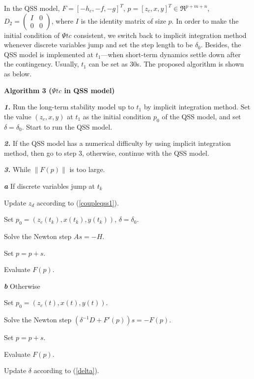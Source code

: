 \documentclass[journal]{IEEEtran}
\begin{document}
In the QSS model, $F=[-h_c,-f,-g]^T$, $p=[z_c,x,y]^T\in\Re^{p+m+n}$, $D_2=\left(\begin{array}{cc}I&0\\0&0\end{array}\right)$, where $I$ is the identity matrix of size $p$. In order to make the initial condition of $\Psi tc$ consistent, we switch back to implicit integration method whenever discrete variables jump and set the step length to be $\delta_{0}$. Besides, the QSS model is implemented at $t_1$---when short-term dynamics settle down after the contingency. Usually, $t_1$ can be set as 30s. The proposed algorithm is shown as below.
\begin{IEEEdescription}
\item[\textbf{Algorithm 3 ($\Psi tc$ in QSS model)}]
\item[\textbf{\textit{1.}}] Run the long-term stability model up to $t_1$ by implicit integration method. Set the value $(z_c,x,y)$ at $t_1$ as the initial condition $p_0$ of the QSS model, and set $\delta=\delta_0$. Start to run the QSS model.
\item[\textbf{\textit{2.}}] If the QSS model has a numerical difficulty by using implicit integration method, then go to step 3, otherwise, continue with the QSS model.
\item[\textbf{\textit{3.}}] While $\|F(p)\|$ is too large.
\begin{LaTeXdescription}
\item[\textbf{\textit{a}}] If discrete variables jump at $t_k$
\begin{LaTeXdescription}
\item[\textbf{\textit{ }}]              Update $z_d$ according to (\ref{coupleqss1}).
\item[\textbf{\textit{ }}]              Set $p_0=(z_c(t_k),x(t_k),y(t_k))$, $\delta=\delta_0$.
\item[\textbf{\textit{ }}]              Solve the Newton step $As=-H$.
\item[\textbf{\textit{ }}]              Set $p=p+s$.
\item[\textbf{\textit{ }}]              Evaluate $F(p)$.
\end{LaTeXdescription}
\item[\textbf{\textit{b}}] Otherwise
\begin{LaTeXdescription}
\item[\textbf{\textit{ }}] Set $p_0=(z_c(t),x(t),y(t))$.
\item[\textbf{\textit{ }}] Solve the Newton step $(\delta^{-1}D+F'(p))s=-F(p)$.
\item[\textbf{\textit{ }}] Set $p=p+s$.
\item[\textbf{\textit{ }}] Evaluate $F(p)$.
\item[\textbf{\textit{ }}] Update $\delta$ according to (\ref{delta}).
\end{LaTeXdescription}
\end{LaTeXdescription}
\end{IEEEdescription}
\end{document}
